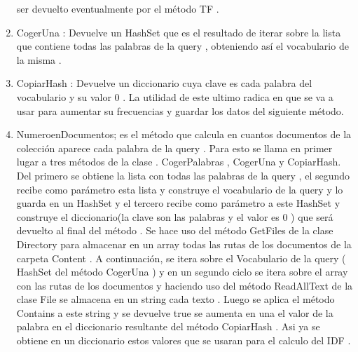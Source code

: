 \documentclass[10pt]{extarticle}
\begin{document}
\begin{enumerate}
	ser devuelto eventualmente por el método TF . 	
    \item CogerUna : Devuelve un  HashSet que es el resultado de iterar sobre la lista que contiene todas las palabras de la query , 
    obteniendo así el vocabulario de la misma .	  
    \item CopiarHash : Devuelve un diccionario cuya clave es cada 	palabra del vocabulario y su valor 0 . La utilidad de este ultimo radica en que se va a usar para aumentar su frecuencias y guardar los datos del siguiente método. 
	\item NumeroenDocumentos; es el método que calcula en cuantos documentos de la 
	colección aparece cada palabra de la query . Para esto se llama en primer lugar a tres métodos de 
	la clase . CogerPalabras , CogerUna y CopiarHash. Del primero se obtiene la lista con todas las 
	palabras de la query , el segundo recibe como parámetro esta lista y construye el vocabulario de la 
	query y lo guarda en un HashSet y el tercero recibe como parámetro a este HashSet y construye el 
	diccionario(la clave son las palabras y el valor es 0 ) que será devuelto al final del método . Se hace 
	uso del método GetFiles de la clase Directory para almacenar en un array todas las rutas de los 
	documentos de la carpeta Content . A continuación, se itera sobre el Vocabulario de la query ( 
	HashSet del método CogerUna ) y en un segundo ciclo se itera sobre el array con las rutas de los 
	documentos y haciendo uso del método ReadAllText de la clase File se almacena en un string cada 
	texto . Luego se aplica el método Contains a este string y se devuelve true se aumenta en una el 
	valor de la palabra en el diccionario resultante del método CopiarHash . Asi ya se obtiene en un 
	diccionario estos valores que se usaran para el calculo del IDF . 

\end{enumerate}
\end{document}

